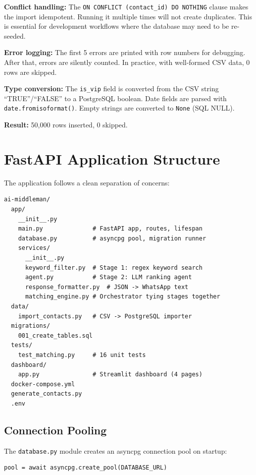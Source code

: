 \documentclass[12pt, a4paper]{report}
\begin{document}
\textbf{Conflict handling:} The \texttt{ON CONFLICT (contact\_id) DO NOTHING} clause makes the import idempotent. Running it multiple times will not create duplicates. This is essential for development workflows where the database may need to be re-seeded.

\textbf{Error logging:} The first 5 errors are printed with row numbers for debugging. After that, errors are silently counted. In practice, with well-formed CSV data, 0 rows are skipped.

\textbf{Type conversion:} The \texttt{is\_vip} field is converted from the CSV string ``TRUE''/``FALSE'' to a PostgreSQL boolean. Date fields are parsed with \texttt{date.fromisoformat()}. Empty strings are converted to \texttt{None} (SQL NULL).

\textbf{Result:} 50,000 rows inserted, 0 skipped.

\section{FastAPI Application Structure}

The application follows a clean separation of concerns:

\begin{verbatim}
ai-middleman/
  app/
    __init__.py
    main.py              # FastAPI app, routes, lifespan
    database.py          # asyncpg pool, migration runner
    services/
      __init__.py
      keyword_filter.py  # Stage 1: regex keyword search
      agent.py           # Stage 2: LLM ranking agent
      response_formatter.py  # JSON -> WhatsApp text
      matching_engine.py # Orchestrator tying stages together
  data/
    import_contacts.py   # CSV -> PostgreSQL importer
  migrations/
    001_create_tables.sql
  tests/
    test_matching.py     # 16 unit tests
  dashboard/
    app.py               # Streamlit dashboard (4 pages)
  docker-compose.yml
  generate_contacts.py
  .env
\end{verbatim}

\subsection{Connection Pooling}

The \texttt{database.py} module creates an asyncpg connection pool on startup:

\begin{lstlisting}[style=pythonstyle]
pool = await asyncpg.create_pool(DATABASE_URL)
\end{lstlisting}
\end{document}
